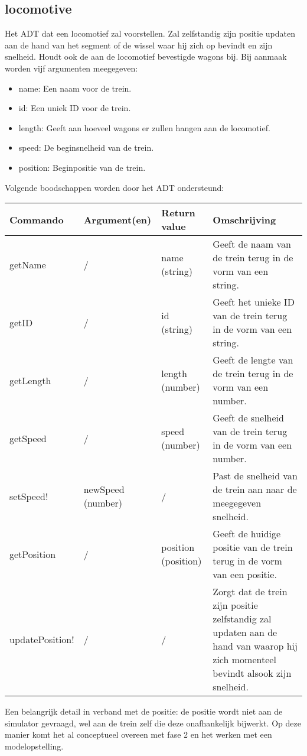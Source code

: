 \documentclass{article}
\begin{document}
\subsection{locomotive}
Het ADT dat een locomotief zal voorstellen. Zal zelfstandig zijn positie updaten aan de hand van het segment of de wissel waar hij zich op bevindt en zijn snelheid. Houdt ook de aan de locomotief bevestigde wagons bij. Bij aanmaak worden vijf argumenten meegegeven:
\begin{itemize}
  \item name: Een naam voor de trein.
  \item id: Een uniek ID voor de trein.
  \item length: Geeft aan hoeveel wagons er zullen hangen aan de locomotief.
  \item speed: De beginsnelheid van de trein.
  \item position: Beginpositie van de trein.
\end{itemize}
Volgende boodschappen worden door het ADT ondersteund:
\begin{center}
    \begin{tabular}{ | l | l | l | p{6.5cm} |}
    \hline
    Commando & Argument(en) & Return value & Omschrijving \\ \hline
    getName & / & name (string) & Geeft de naam van de trein terug in de vorm van een string. \\ \hline
    getID & / & id (string) & Geeft het unieke ID van de trein terug in de vorm van een string. \\ \hline
    getLength & / & length (number) & Geeft de lengte van de trein terug in de vorm van een number. \\ \hline
    getSpeed & / & speed (number) & Geeft de snelheid van de trein terug in de vorm van een number. \\ \hline
    setSpeed! & newSpeed (number) & / & Past de snelheid van de trein aan naar de meegegeven snelheid. \\ \hline
    getPosition & / & position (position) & Geeft de huidige positie van de trein terug in de vorm van een positie. \\ \hline
    updatePosition! & / & / & Zorgt dat de trein zijn positie zelfstandig zal updaten aan de hand van waarop hij zich momenteel bevindt alsook zijn snelheid. \\ \hline
    \end{tabular}
\end{center}
Een belangrijk detail in verband met de positie: de positie wordt niet aan de simulator gevraagd, wel aan de trein zelf die deze onafhankelijk bijwerkt. Op deze manier komt het al conceptueel overeen met fase 2 en het werken met een modelopstelling.
\end{document}
